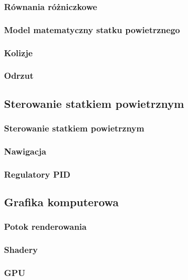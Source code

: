 \documentclass[aspectratio=169]{beamer}
\begin{document}
\begin{frame}[allowframebreaks]
	\frametitle{Równania różniczkowe}
	
\end{frame}

\begin{frame}[allowframebreaks]
	\frametitle{Model matematyczny statku powietrznego}
	
\end{frame}

\begin{frame}[allowframebreaks]
	\frametitle{Kolizje}
	
\end{frame}

\begin{frame}[allowframebreaks]
	\frametitle{Odrzut}
	
\end{frame}

\subsection{Sterowanie statkiem powietrznym}
\begin{frame}[allowframebreaks]
	\frametitle{Sterowanie statkiem powietrznym}
\end{frame}

\begin{frame}[allowframebreaks]
	\frametitle{Nawigacja}
	
\end{frame}

\begin{frame}[allowframebreaks]
	\frametitle{Regulatory PID}
	
\end{frame}

\subsection{Grafika komputerowa}

\begin{frame}[allowframebreaks]
	\frametitle{Potok renderowania}
	
\end{frame}

\begin{frame}[allowframebreaks]
	\frametitle{Shadery}
	
\end{frame}

\begin{frame}[allowframebreaks]
	\frametitle{GPU}
	
\end{frame}
\end{document}
